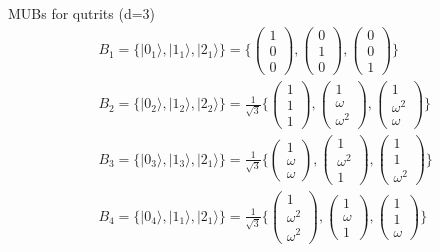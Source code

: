 \documentclass[a4paper]{article}
\begin{document}
MUBs for qutrits (d=3)
\begin{align}
    &B_1 = \{|0_1\rangle, |1_1\rangle, |2_1\rangle\} =
    \bigg\{
        \begin{pmatrix}1 \\ 0\\0\end{pmatrix},
        \begin{pmatrix}0 \\ 1\\0\end{pmatrix},
        \begin{pmatrix}0 \\ 0\\1\end{pmatrix}
    \bigg\}
    \\
    &B_2 = \{|0_2\rangle, |1_2\rangle, |2_2\rangle\} =
    \frac{1}{\sqrt{3}}
    \bigg\{
        \begin{pmatrix}1 \\ 1\\1\end{pmatrix},
        \begin{pmatrix}1 \\ \omega\\\omega^2\end{pmatrix},
        \begin{pmatrix}1 \\ \omega^2\\\omega\end{pmatrix}
    \bigg\}
    \\
    &B_3 = \{|0_3\rangle, |1_3\rangle, |2_1\rangle\} =
    \frac{1}{\sqrt{3}}
    \bigg\{
        \begin{pmatrix}1 \\\omega\\\omega\end{pmatrix},
        \begin{pmatrix}1 \\ \omega^2\\1\end{pmatrix},
        \begin{pmatrix}1 \\ 1\\\omega^2\end{pmatrix}
    \bigg\}        \\
    &B_4 = \{|0_4\rangle, |1_1\rangle, |2_1\rangle\} =
    \frac{1}{\sqrt{3}}
    \bigg\{
        \begin{pmatrix}1 \\\omega^2\\\omega^2\end{pmatrix},
        \begin{pmatrix}1 \\ \omega\\1\end{pmatrix},
        \begin{pmatrix}1 \\ 1\\\omega\end{pmatrix}
    \bigg\}
\end{align}
\end{document}
